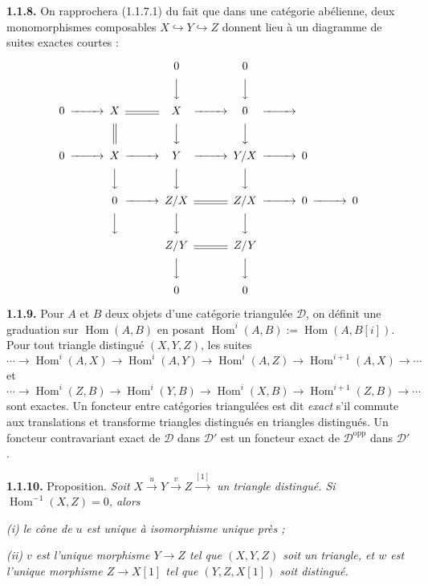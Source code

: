 \documentclass[12pt,a4paper]{article}
\theoremstyle{plain}
\theoremstyle{definition}
\theoremstyle{remark}
\DeclareMathOperator{\Hom}{Hom}
\newcommand{\cD}{\mathcal{D}}
\begin{document}
\medskip

\noindent
\textbf{1.1.8.} On rapprochera (1.1.7.1) du fait que dans une catégorie abélienne, deux monomorphismes composables $X \hookrightarrow Y \hookrightarrow Z$ donnent lieu à un diagramme de suites exactes courtes :

\begin{center}
\[
\begin{CD}
@. @. 0 @. 0 @. @. \\
@. @. @VVV @VVV @. @. \\
0 @>>> X @= X @>>> 0 @>>> \\
@. @| @VVV @VVV @. @. \\
0 @>>> X @>>> Y @>>> Y/X @>>> 0 \\
@. @VVV @VVV @VVV @. @. \\
@. 0 @>>> Z/X @= Z/X @>>> 0 @>>> 0 \\
@. @VVV @VVV @VVV @. @. \\
@. @. Z/Y @= Z/Y @. @. \\
@. @. @VVV @VVV @. @. \\
@. @. 0 @. 0 @. @.
\end{CD}
\]
\end{center}

\medskip

\noindent
\textbf{1.1.9.} Pour $A$ et $B$ deux objets d'une catégorie triangulée $\cD$, on définit une graduation sur $\Hom(A, B)$ en posant $\Hom^{i}(A, B) := \Hom(A, B[i])$. Pour tout triangle distingué $(X, Y, Z)$, les suites
\[
\cdots \to \Hom^{i}(A, X) \to \Hom^{i}(A, Y) \to \Hom^{i}(A, Z) \to \Hom^{i+1}(A, X) \to \cdots
\]
et
\[
\cdots \to \Hom^{i}(Z, B) \to \Hom^{i}(Y, B) \to \Hom^{i}(X, B) \to \Hom^{i+1}(Z, B) \to \cdots
\]
sont exactes. Un foncteur entre catégories triangulées est dit \emph{exact} s'il commute aux translations et transforme triangles distingués en triangles distingués. Un foncteur contravariant exact de $\cD$ dans $\cD'$ est un foncteur exact de $\cD^{\mathrm{opp}}$ dans $\cD'$.

\medskip

\noindent
\textbf{1.1.10.} Proposition. \emph{Soit $X \xrightarrow{u} Y \xrightarrow{v} Z \xrightarrow{[1]}$ un triangle distingué. Si $\Hom^{-1}(X, Z) = 0$, alors}

\emph{(i) le cône de $u$ est unique à isomorphisme unique près ;}

\emph{(ii) $v$ est l'unique morphisme $Y \to Z$ tel que $(X, Y, Z)$ soit un triangle, et $w$ est l'unique morphisme $Z \to X[1]$ tel que $(Y, Z, X[1])$ soit distingué.}
\end{document}
